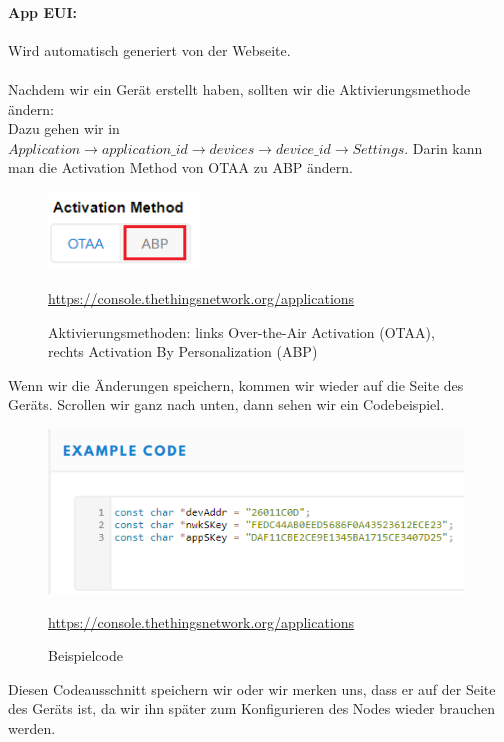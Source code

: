 \paragraph{App EUI:} Wird automatisch generiert von der Webseite.\\
\\
Nachdem wir ein Gerät erstellt haben, sollten wir die Aktivierungsmethode ändern:\\
Dazu gehen wir in $Application \rightarrow application\_id \rightarrow devices \rightarrow device\_id \rightarrow Settings$. Darin kann man die Activation Method von OTAA zu ABP ändern.
\begin{figure}[H]
    \center
    \includegraphics[width=4cm]{Bilder/lora-6.png}\\
    \caption{Aktivierungsmethoden: links Over-the-Air Activation (OTAA), rechts Activation By Personalization (ABP)}
    \begin{center} \quelle\url{https://console.thethingsnetwork.org/applications} \end{center}
\end{figure}
\noindent
Wenn wir die Änderungen speichern, kommen wir wieder auf die Seite des Geräts. Scrollen wir ganz nach unten, dann sehen wir ein Codebeispiel.
\begin{figure}[H]
    \center
    \includegraphics[width=11cm]{Bilder/lora-7.png}\\
    \caption{Beispielcode}
    \begin{center} \quelle\url{https://console.thethingsnetwork.org/applications} \end{center}
    \label{fig:beispielcode}
\end{figure}
\noindent
Diesen Codeausschnitt speichern wir oder wir merken uns, dass er auf der Seite des Geräts ist, da wir ihn später zum Konfigurieren des Nodes wieder brauchen werden. 
